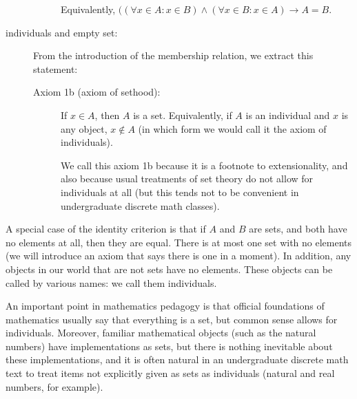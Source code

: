 \documentclass[12pt]{article}
\begin{document}
\begin{description}
\begin{description}
Equivalently, $((\forall x \in A: x\in B) \wedge (\forall x \in B:x \in A) \rightarrow A=B$.

\end{description}

\item[individuals and empty set:]   From the introduction of the membership relation, we extract this statement:  

\begin{description}
\item[Axiom 1b (axiom of sethood):]  If $x \in A$, then $A$ is a set.  Equivalently, if $A$ is an individual and $x$ is any object, $x \not\in A$ (in which form we would call it the axiom of individuals).

We call this axiom 1b because it is a footnote to extensionality, and also because usual treatments of set theory do not allow for individuals at all (but this tends not to be convenient in undergraduate discrete math classes).
\end{description}

\end{description}

A special case of the identity criterion is that if $A$ and $B$ are sets, and both have no elements at all, then they are equal.   There is at most one set with no elements (we will introduce an axiom that says there is one in a moment).  In addition, any objects in our world that are not sets have no elements.  These objects can be called by various names:  we call them individuals.

An important point in mathematics pedagogy is that official foundations of mathematics usually say that everything is a set,  but common sense allows for individuals.  Moreover, familiar mathematical objects (such as the natural numbers) have implementations as sets, but there is nothing inevitable about these implementations, and it is often natural in an undergraduate discrete math text to treat items not explicitly given as sets as individuals (natural and real numbers, for example).

\newpage
\end{document}
